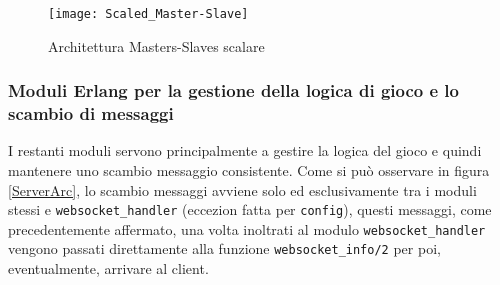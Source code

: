 \documentclass[paper=a4, fontsize=11pt]{scrartcl} %
\numberwithin{equation}{section} %
\numberwithin{figure}{section} %
\numberwithin{table}{section} %
\begin{document}
\begin{figure}
\centering
\texttt{[image: Scaled\_Master-Slave]}
\caption{Architettura Masters-Slaves scalare}
\label{Scaled-Master-Slave}
\end{figure}
\subsubsection{Moduli Erlang per la gestione della logica di gioco e lo scambio di messaggi}
I restanti moduli servono principalmente a gestire la logica del gioco e quindi mantenere uno scambio messaggio consistente. Come si può osservare in figura \ref{ServerArc}, lo scambio messaggi avviene solo ed esclusivamente tra i moduli stessi e \texttt{websocket\_handler} (eccezion fatta per \texttt{config}), questi messaggi, come precedentemente affermato, una volta inoltrati al modulo \texttt{websocket\_handler} vengono passati direttamente alla funzione \texttt{websocket\_info/2} per poi, eventualmente, arrivare al client.
\end{document}
